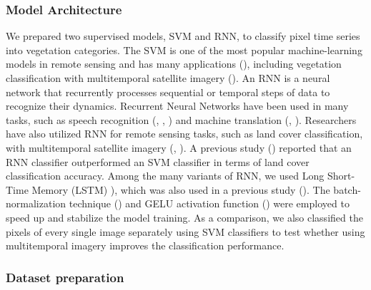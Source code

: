\documentclass{article}
\begin{document}
\hypertarget{model-architecture}{%
\subsubsection{Model Architecture}\label{model-architecture}}

We prepared two supervised models, SVM and RNN, to classify pixel time series into vegetation categories. The SVM is one of the most popular machine-learning models in remote sensing and has many applications (\cite{Mountrakis2011SVMReview}), including vegetation classification with multitemporal satellite imagery (\cite{Tigges2013RemSenEnv}). An RNN is a neural network that recurrently processes sequential or temporal steps of data to recognize their dynamics. Recurrent Neural Networks have been used in many tasks, such as speech recognition (\cite{Graves2013SpeechRNN}, \cite{Graves2014SpeechRNN}, \cite{Sak2014acousticLSTM}) and machine translation (\cite{Auli2013translationRNN}, \cite{Cho2014RNN}). Researchers have also utilized RNN for remote sensing tasks, such as land cover classification, with multitemporal satellite imagery (\cite{Ienco2017RemSenLSTM}, \cite{Sharma2018NN}). A previous study (\cite{Ienco2017RemSenLSTM}) reported that an RNN classifier outperformed an SVM classifier in terms of land cover classification accuracy. Among the many variants of RNN, we used Long Short-Time Memory (LSTM) \cite{Hochreiter1997LSTM}), which was also used in a previous study (\cite{Ienco2017RemSenLSTM}). The batch-normalization technique (\cite{IoffeSzegedy2015BatchNorm}) and GELU activation function (\cite{HendrycksGimpel2016GELU}) were employed to speed up and stabilize the model training. As a comparison, we also classified the pixels of every single image separately using SVM classifiers to test whether using multitemporal imagery improves the classification performance.

\hypertarget{dataset-preparation}{%
\subsubsection{Dataset preparation}\label{dataset-preparation}}
\end{document}
